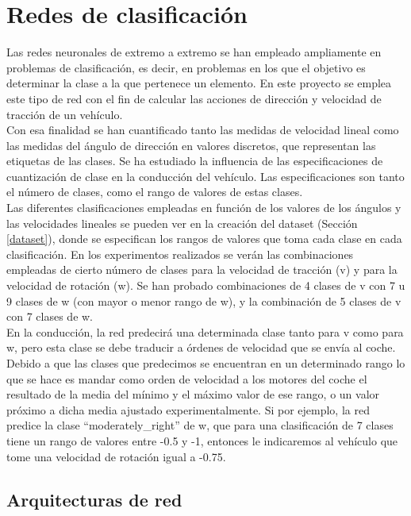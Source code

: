 \chapter{Redes de clasificación}\label{cap.clasificacion}

Las redes neuronales de extremo a extremo se han empleado ampliamente en problemas de clasificación, es decir, en problemas en los que el objetivo es determinar la clase a la que pertenece un elemento. En este proyecto se emplea este tipo de red con el fin de calcular las acciones de dirección y velocidad de tracción de un vehículo.\\

Con esa finalidad se han cuantificado tanto las medidas de velocidad lineal como las medidas del ángulo de dirección en valores discretos, que representan las etiquetas de las clases. Se ha estudiado la influencia de las especificaciones de cuantización de clase en la conducción del vehículo. Las especificaciones son tanto el número de clases, como el rango de valores de estas clases.\\

Las diferentes clasificaciones empleadas en función de los valores de los ángulos y las velocidades lineales se pueden ver en la creación del dataset (Sección \ref{dataset}), donde se especifican los rangos de valores que toma cada clase en cada clasificación. En los experimentos realizados se verán las combinaciones empleadas de cierto número de clases para la velocidad de tracción (v) y para la velocidad de rotación (w). Se han probado combinaciones de 4 clases de v con 7 u 9 clases de w (con mayor o menor rango de w), y la combinación de 5 clases de v con 7 clases de w.\\

En la conducción, la red predecirá una determinada clase tanto para v como para w, pero esta clase se debe traducir a órdenes de velocidad que se envía al coche. Debido a que las clases que predecimos se encuentran en un determinado rango lo que se hace es mandar como orden de velocidad a los motores del coche el resultado de la media del mínimo y el máximo valor de ese rango, o un valor próximo a dicha media ajustado experimentalmente. Si por ejemplo, la red predice la clase ``moderately\_right'' de w, que para una clasificación de 7 clases tiene un rango de valores entre -0.5 y -1, entonces le indicaremos al vehículo que tome una velocidad de rotación igual a -0.75.\\


\section{Arquitecturas de red}

